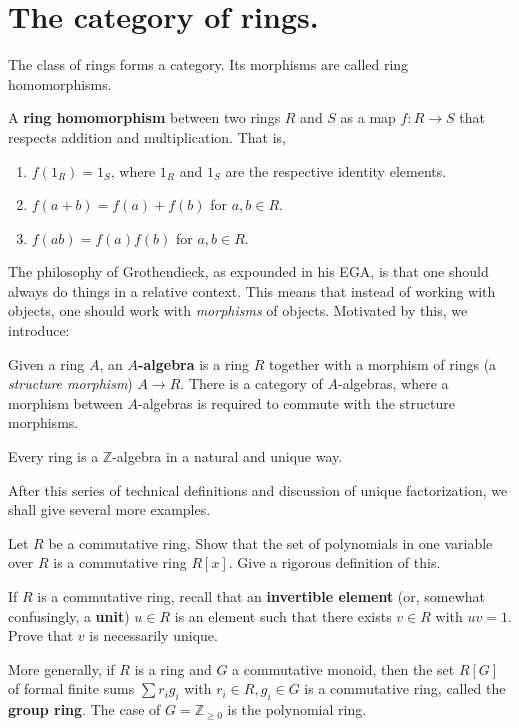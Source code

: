 \section{The category of rings.}

The class of rings forms a category. Its morphisms are called ring homomorphisms.

\begin{definition}
A \textbf{ring homomorphism} between two rings $R$ and $S$ as a map
$f : R \to S$ that respects addition and multiplication. That is,

\begin{enumerate}
  \item $f(1_R) = 1_S$, where $1_R$ and $1_S$ are the respective identity
        elements.
  \item $f(a + b) = f(a) + f(b)$ for $a, b \in R$.
  \item $f(ab) = f(a)f(b)$ for $a, b \in R$.
\end{enumerate}
\end{definition}

The philosophy of Grothendieck, as expounded in his EGA, is that one should
always do things in a relative context. This means that instead of working
with objects, one should work with \emph{morphisms} of objects. Motivated by
this, we introduce:

\begin{definition} 
Given a ring $A$, an \textbf{$A$-algebra} is a ring $R$ together with a
morphism of rings (a \emph{structure morphism}) $A \to R$. There is a category of $A$-algebras, where a
morphism between $A$-algebras is required to commute with the structure
morphisms. 
\end{definition} 

\begin{example} 
Every ring is a $\mathbb{Z}$-algebra in a natural and unique way.
\end{example}

After this series of technical definitions and discussion of unique
factorization, we shall give several more  examples.

\begin{exercise}\label{polynomial} Let $R$ be a commutative ring.
Show that the set of polynomials in one variable over $R$ is a commutative
ring $R[x]$. Give a rigorous definition of this.
\end{exercise} 
\begin{exercise} 
If $R$ is a commutative ring, recall that an \textbf{invertible element} (or, somewhat
confusingly, a \textbf{unit}) $u \in R$ is an element such
that there exists $v \in R$ with $uv = 1$. Prove that $v$ is necessarily
unique.
\end{exercise}
\begin{exercise} 
More generally, if $R$ is a ring and $G$ a commutative monoid, then the set
$R[G]$ of formal finite sums $\sum r_i g_i$ with $r_i \in R, g_i \in G$ is a
commutative ring, called the \textbf{group ring}. The case of $G =
\mathbb{Z}_{\geq 0}$ is the polynomial ring. 
\end{exercise} 


